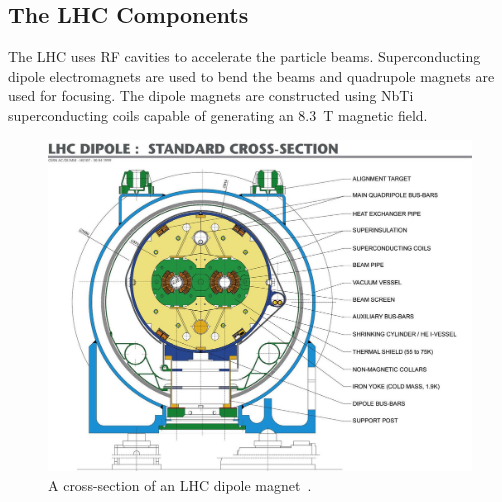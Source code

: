 \subsection{The LHC Components}

The LHC uses RF cavities to accelerate the particle beams. Superconducting dipole electromagnets are used to bend the beams and quadrupole magnets are used for focusing.  The dipole magnets are constructed using NbTi superconducting coils capable of generating an 8.3~T magnetic field. 

\begin{figure}[!htb]
	\centering
	\includegraphics[scale=0.50]{figures/lhc_dipole}
	\caption{A cross-section of an LHC dipole magnet~\cite{Team:40524}.}
	\label{lhc-dipole}
\end{figure}


